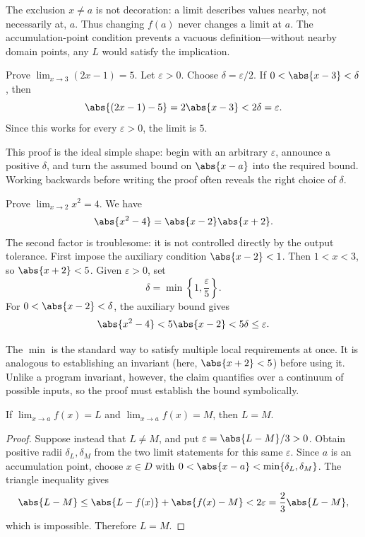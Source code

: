 The exclusion $x\ne a$ is not decoration: a limit describes values nearby,
not necessarily at, $a$.  Thus changing $f(a)$ never changes a limit at $a$.
The accumulation-point condition prevents a vacuous definition---without
nearby domain points, any $L$ would satisfy the implication.

\begin{example}
Prove $\lim_{x\to 3}(2x-1)=5$.  Let $\varepsilon>0$.  Choose
$\delta=\varepsilon/2$.  If $0<\abs{x-3}<\delta$, then
\[
  \abs{(2x-1)-5}=2\abs{x-3}<2\delta=\varepsilon.
\]
Since this works for every $\varepsilon>0$, the limit is $5$.
\end{example}

This proof is the ideal simple shape: begin with an arbitrary $\varepsilon$,
announce a positive $\delta$, and turn the assumed bound on $\abs{x-a}$ into
the required bound.  Working backwards before writing the proof often reveals
the right choice of $\delta$.

\begin{example}
Prove $\lim_{x\to 2}x^2=4$.  We have
\[
  \abs{x^2-4}=\abs{x-2}\abs{x+2}.
\]
The second factor is troublesome: it is not controlled directly by the output
tolerance.  First impose the auxiliary condition $\abs{x-2}<1$.  Then
$1<x<3$, so $\abs{x+2}<5$.  Given $\varepsilon>0$, set
\[
  \delta=\min\left\{1,\frac{\varepsilon}{5}\right\}.
\]
For $0<\abs{x-2}<\delta$, the auxiliary bound gives
\[
  \abs{x^2-4}<5\abs{x-2}<5\delta\leq\varepsilon.
\]
\end{example}

The $\min$ is the standard way to satisfy multiple local requirements at
once.  It is analogous to establishing an invariant (here, $\abs{x+2}<5$)
before using it.  Unlike a program invariant, however, the claim quantifies
over a continuum of possible inputs, so the proof must establish the bound
symbolically.

\begin{theorem}
If $\lim_{x\to a}f(x)=L$ and $\lim_{x\to a}f(x)=M$, then $L=M$.
\end{theorem}

\begin{proof}
Suppose instead that $L\ne M$, and put
$\varepsilon=\abs{L-M}/3>0$.  Obtain positive radii $\delta_L,\delta_M$
from the two limit statements for this same $\varepsilon$.  Since $a$ is an
accumulation point, choose $x\in D$ with
$0<\abs{x-a}<\min\{\delta_L,\delta_M\}$.  The triangle inequality gives
\[
  \abs{L-M}\leq \abs{L-f(x)}+\abs{f(x)-M}
  <2\varepsilon=\frac{2}{3}\abs{L-M},
\]
which is impossible.  Therefore $L=M$.
\end{proof}

